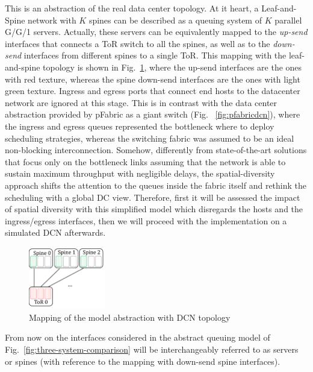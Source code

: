 This is an abstraction of the real data center topology. At it heart, a Leaf-and-Spine network with $K$ spines can be described as a queuing system of $K$ parallel G/G/1 servers. Actually, these servers can be equivalently mapped to the \textit{up-send} interfaces that connects a ToR switch to all the spines, as well as to the \textit{down-send} interfaces from different spines to a single ToR. This mapping with the leaf-and-spine topology is shown in Fig.~\ref{fig:model-dc-map}, where the up-send interfaces are the ones with red texture, whereas the spine down-send interfaces are the ones with light green texture. Ingress and egress ports that connect end hosts to the datacenter network are ignored at this stage. This is in contrast with the data center abstraction provided by pFabric as a giant switch (Fig.~ \ref{fig:pfabricdcn}), where the ingress and egress queues represented the bottleneck where to deploy scheduling strategies, whereas the switching fabric was assumed to be an ideal non-blocking interconnection. Somehow, differently from state-of-the-art solutions that focus only on the bottleneck links assuming that the network is able to sustain maximum throughput with negligible delays, the spatial-diversity approach shifts the attention to the queues inside the fabric itself and rethink the scheduling with a global DC view. Therefore, first it will be assessed the impact of spatial diversity with this simplified model which disregards the hosts and the ingress/egress interfaces, then we will proceed with the implementation on a simulated DCN afterwards.  \\
\begin{figure}
	\centering
	\includegraphics[width=0.3\textwidth]{ChapterSpatialDiversityFramework/Figures/model-dc-map}
	\caption{Mapping of the model abstraction with DCN topology}
	\label{fig:model-dc-map}
\end{figure}
From now on the interfaces considered in the abstract queuing model  of Fig.~\ref{fig:three-system-comparison} will be interchangeably referred to as servers or spines (with reference to the mapping with down-send spine interfaces).  

